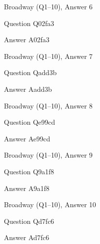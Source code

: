 \documentclass[11pt]{beamer}
\begin{document}
\begin{frame}[t]{Broadway (Q1--10), Answer 6}
\vspace{2em}
\begin{block}{Question}
Q02fa3
\end{block}
\pause{}
\begin{block}{Answer}
A02fa3
\end{block}
\end{frame}
    

\begin{frame}[t]{Broadway (Q1--10), Answer 7}
\vspace{2em}
\begin{block}{Question}
Qadd3b
\end{block}
\pause{}
\begin{block}{Answer}
Aadd3b
\end{block}
\end{frame}
    

\begin{frame}[t]{Broadway (Q1--10), Answer 8}
\vspace{2em}
\begin{block}{Question}
Qe99cd
\end{block}
\pause{}
\begin{block}{Answer}
Ae99cd
\end{block}
\end{frame}
    

\begin{frame}[t]{Broadway (Q1--10), Answer 9}
\vspace{2em}
\begin{block}{Question}
Q9a1f8
\end{block}
\pause{}
\begin{block}{Answer}
A9a1f8
\end{block}
\end{frame}
    

\begin{frame}[t]{Broadway (Q1--10), Answer 10}
\vspace{2em}
\begin{block}{Question}
Qd7fc6
\end{block}
\pause{}
\begin{block}{Answer}
Ad7fc6
\end{block}
\end{frame}
    

\section*{\ }
\end{document}
